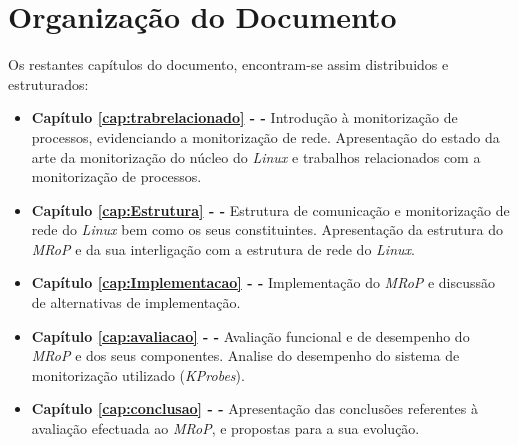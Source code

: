 \bigskip 


\section{Organização do Documento}
\label{sec:intro_document_outline}

Os restantes capítulos do documento, encontram-se assim distribuidos e estruturados:

\begin{itemize}
	\item \textbf{Capítulo \ref{cap:trabrelacionado} -  - } Introdução à monitorização de processos, evidenciando a monitorização de rede. Apresentação do estado da arte da monitorização do núcleo do \textit{Linux} e trabalhos relacionados com a monitorização de processos.

	\item \textbf{Capítulo \ref{cap:Estrutura} -   - } Estrutura de comunicação e monitorização de rede do \textit{Linux} bem como os seus constituintes. Apresentação da estrutura do \textit{MRoP} e da sua interligação com a estrutura de rede do \textit{Linux}.

	\item \textbf{Capítulo \ref{cap:Implementacao} -  - } Implementação do \textit{MRoP} e discussão de alternativas de implementação.

	\item \textbf{Capítulo \ref{cap:avaliacao} -  - } Avaliação funcional e de desempenho do \textit{MRoP} e dos seus componentes. Analise do desempenho do sistema de monitorização utilizado (\textit{KProbes}).

	\item \textbf{Capítulo \ref{cap:conclusao} -  - } Apresentação das conclusões referentes à avaliação efectuada ao \textit{MRoP}, e propostas para a sua evolução.

\end{itemize}
